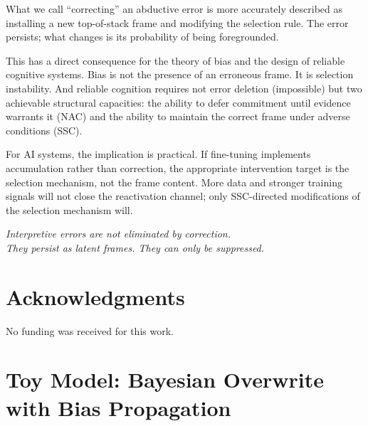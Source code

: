 \documentclass[12pt]{article}
\begin{document}
What we call ``correcting'' an abductive error is more accurately
described as installing a new top-of-stack frame and modifying the
selection rule.
The error persists; what changes is its probability of being
foregrounded.

This has a direct consequence for the theory of bias and the design
of reliable cognitive systems.
Bias is not the presence of an erroneous frame.
It is selection instability.
And reliable cognition requires not error deletion (impossible) but
two achievable structural capacities: the ability to defer commitment
until evidence warrants it (NAC) and the ability to maintain the
correct frame under adverse conditions (SSC).

For AI systems, the implication is practical.
If fine-tuning implements accumulation rather than correction,
the appropriate intervention target is the selection mechanism,
not the frame content.
More data and stronger training signals will not close the
reactivation channel; only SSC-directed modifications of the
selection mechanism will.

\medskip
\noindent
\textit{Interpretive errors are not eliminated by correction.\\
They persist as latent frames. They can only be suppressed.}

\section*{Acknowledgments}

No funding was received for this work.



\appendix

\section{Toy Model: Bayesian Overwrite with Bias Propagation}
\label{app:toy-bayes}
\end{document}
